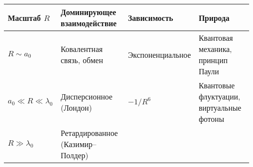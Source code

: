 \documentclass[11pt]{article}
\begin{document}
\begin{longtable}[]{@{}llll@{}}
\toprule
\begin{minipage}[b]{0.21\columnwidth}\raggedright\strut
Масштаб \(R\)\strut
\end{minipage} & \begin{minipage}[b]{0.38\columnwidth}\raggedright\strut
Доминирующее взаимодействие\strut
\end{minipage} & \begin{minipage}[b]{0.17\columnwidth}\raggedright\strut
Зависимость\strut
\end{minipage} & \begin{minipage}[b]{0.11\columnwidth}\raggedright\strut
Природа\strut
\end{minipage}\tabularnewline
\midrule
\endhead
\begin{minipage}[t]{0.21\columnwidth}\raggedright\strut
\(R \sim a_0\)\strut
\end{minipage} & \begin{minipage}[t]{0.38\columnwidth}\raggedright\strut
Ковалентная связь, обмен\strut
\end{minipage} & \begin{minipage}[t]{0.17\columnwidth}\raggedright\strut
Экспоненциальное\strut
\end{minipage} & \begin{minipage}[t]{0.11\columnwidth}\raggedright\strut
Квантовая механика, принцип Паули\strut
\end{minipage}\tabularnewline
\begin{minipage}[t]{0.21\columnwidth}\raggedright\strut
\(a_0 \ll R \ll \lambda_0\)\strut
\end{minipage} & \begin{minipage}[t]{0.38\columnwidth}\raggedright\strut
Дисперсионное (Лондон)\strut
\end{minipage} & \begin{minipage}[t]{0.17\columnwidth}\raggedright\strut
\(-1/R^6\)\strut
\end{minipage} & \begin{minipage}[t]{0.11\columnwidth}\raggedright\strut
Квантовые флуктуации, виртуальные фотоны\strut
\end{minipage}\tabularnewline
\begin{minipage}[t]{0.21\columnwidth}\raggedright\strut
\(R \gg \lambda_0\)\strut
\end{minipage} & \begin{minipage}[t]{0.38\columnwidth}\raggedright\strut
Ретардированное (Казимир--Полдер)\strut

\end{minipage}
\end{longtable}
\end{document}
